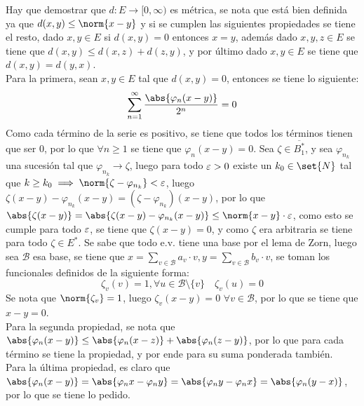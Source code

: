 \documentclass{homework}
\begin{document}
\begin{sol}
    Hay que demostrar que \(d:E\rightarrow[0,\infty)\) es métrica, se nota que está bien definida ya que \(d(x,y)\leq\norm{x-y}\) y si se cumplen las siguientes propiedades se tiene el resto, dado \(x,y\in E\) si \(d(x,y)=0\) entonces \(x=y\), además dado \(x,y,z\in E\) se tiene que \(d(x,y)\leq d(x,z)+d(z,y)\), y por último dado \(x,y\in E\) se tiene que \(d(x,y)=d(y,x)\).\\
    Para la primera, sean \(x,y\in E\) tal que \(d(x,y)=0\), entonces se tiene lo siguiente:
    \begin{equation*}
        \sum_{n=1}^\infty\frac{\abs{\varphi_n(x-y)}}{2^n}=0
    \end{equation*}
    Como cada término de la serie es positivo, se tiene que todos los términos tienen que ser \(0\), por lo que \(\forall n\geq1\) se tiene que \(\varphi_n(x-y)=0\). Sea \(\zeta\in\overline{B_1^*}\), y sea \(\varphi_{n_k}\) una sucesión tal que \(\varphi_{n_k}\rightarrow\zeta\), luego para todo \(\varepsilon>0\) existe un \(k_0\in\set{N}\) tal que \(k\geq k_0\implies \norm{\zeta-\varphi_{n_k}}<\e\), luego \(\zeta(x-y)-\varphi_{n_k}(x-y)=(\zeta-\varphi_{n_k})(x-y)\), por lo que \(\abs{\zeta(x-y)}=\abs{\zeta(x-y)-\varphi_{n_k}(x-y)}\leq\norm{x-y}\cdot\e\), como esto se cumple para todo \(\varepsilon\), se tiene que \(\zeta(x-y)=0\), y como \(\zeta\) era arbitraria se tiene para todo \(\zeta\in E^*\). Se sabe que todo e.v. tiene una base por el lema de Zorn, luego sea \(\mathcal{B}\) esa base, se tiene que \(x=\sum_{v\in\mathcal{B}}a_v\cdot v,y=\sum_{v\in\mathcal{B}}b_v\cdot v\), se toman los funcionales definidos de la siguiente forma:
    \begin{equation*}
        \zeta_v(v)=1, \forall u\in\mathcal{B}\setminus\{v\}\quad\zeta_v(u)=0
    \end{equation*}
    Se nota que \(\norm{\zeta_v}=1\), luego \(\zeta_v(x-y)=0\) \(\forall v\in\mathcal{B}\), por lo que se tiene que \(x-y=0\).\\
    Para la segunda propiedad, se nota que \(\abs{\varphi_n(x-y)}\leq\abs{\varphi_n(x-z)}+\abs{\varphi_n(z-y)}\), por lo que para cada término se tiene la propiedad, y por ende para su suma ponderada también.\\
    Para la última propiedad, es claro que \(\abs{\varphi_n(x-y)}=\abs{\varphi_nx-\varphi_ny}=\abs{\varphi_ny-\varphi_nx}=\abs{\varphi_n(y-x)}\), por lo que se tiene lo pedido.
\end{sol}
\end{document}

